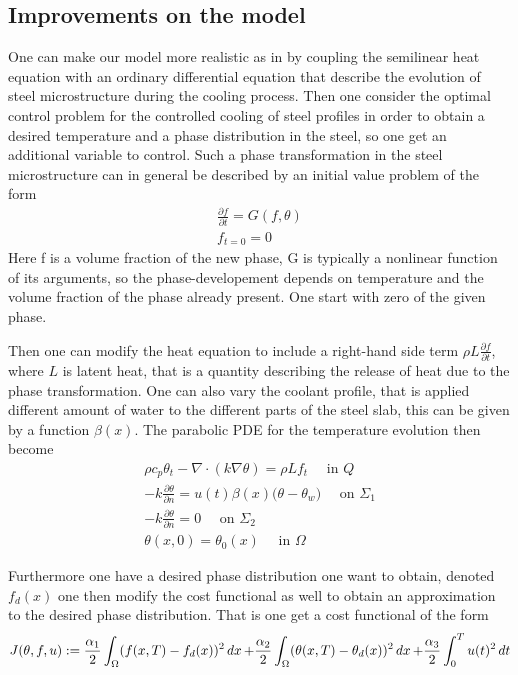 


\subsection{Improvements on the model}
One can make our model more realistic as in \cite{DPSteelOverview} by coupling the semilinear heat equation with an ordinary differential equation that describe the evolution of steel microstructure during the cooling process. Then one consider the optimal control problem for the controlled cooling of steel profiles in order to obtain a desired temperature and a phase distribution in the steel, so one get an additional variable to control. Such a phase transformation in the steel microstructure can in general be described by an initial value problem of the form 
\begin{align*}
    \frac{\partial f}{\partial t} = G(f,\theta ) \\
    f_{t=0} = 0
\end{align*}
Here f is a volume fraction of the new phase, G is typically a nonlinear function of its arguments, so the phase-developement depends on temperature and the volume fraction of the phase already present. One start with zero of the given phase. 

Then one can modify the heat equation to include a right-hand side term $\rho L \frac{\partial f}{\partial t}$, where $L$ is latent heat, that is a quantity describing the release of heat due to the phase transformation. One can also vary the coolant profile, that is applied different amount of water to the different parts of the steel slab, this can be given by a function $\beta (x)$. The parabolic PDE for the temperature evolution then become 
\begin{align*}
    \rho c_p \theta_t - \nabla \cdot (k\nabla \theta) = \rho L f_t \quad \textrm{ in } Q \\
    - k \frac{\partial \theta}{\partial n} = u(t)\beta(x) \bigg (\theta - \theta_w \bigg ) \quad \textrm{ on } \Sigma_1 \\
    -k \frac{\partial \theta}{\partial n} = 0 \quad \textrm{ on } \Sigma_2 \\
    \theta(x,0) = \theta_0(x) \quad \textrm{ in } \Omega
\end{align*}

Furthermore one have a desired phase distribution one want to obtain, denoted $f_d(x)$ one then modify the cost functional as well to obtain an approximation to the desired phase distribution. That is one get a cost functional of the form 
\begin{equation*}
    J(\theta, f, u) := \frac{\alpha_1}{2}\int_{\Omega}(f(x,T)-f_d(x))^2\mathop{dx} + \frac{\alpha_2}{2}\int_{\Omega}(\theta(x,T) - \theta_d(x))^2\mathop{dx} + \frac{\alpha_3}{2}\int_0^Tu(t)^2 \mathop{dt}
\end{equation*}

